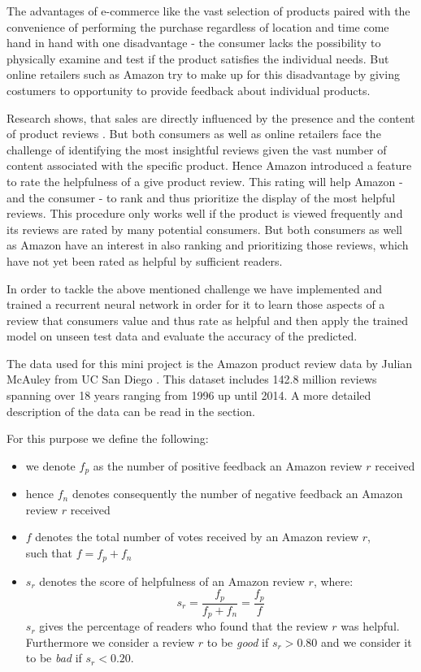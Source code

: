 \documentclass[a4paper,11pt]{article}
\begin{document}
The advantages of e-commerce like the vast selection of products paired with the convenience of performing the purchase regardless of location and time come hand in hand with one disadvantage - the consumer lacks the possibility to physically examine and test if the product satisfies the individual needs. But online retailers such as Amazon try to make up for this disadvantage by giving costumers to opportunity to provide feedback about individual products.

Research shows, that sales are directly influenced by the presence and the content of product reviews \cite{ChXi08}. But both consumers as well as online retailers face the challenge of identifying the most insightful reviews given the vast number of content associated with the specific product. Hence Amazon introduced a feature to rate the helpfulness of a give product review. This rating will help Amazon - and the consumer - to rank and thus prioritize the display of the most helpful reviews. This procedure only works well if the product is viewed frequently and its reviews are rated by many potential consumers. But both consumers as well as Amazon have an interest in also ranking and prioritizing those reviews, which have not yet been rated as helpful by sufficient readers.

In order to tackle the above mentioned challenge we have implemented and trained a recurrent neural network in order for it to learn those aspects of a review that consumers value and thus rate as helpful and then apply the trained model on unseen test data and evaluate the accuracy of the predicted.

The data used for this mini project is the Amazon product review data by Julian McAuley from UC San Diego \cite{HeMcA16a} \cite{McATarShiHen15}. This dataset includes 142.8 million reviews spanning over 18 years ranging from 1996 up until  2014. A more detailed description of the data can be read in the  section. 

For this purpose we define the following:

\begin{itemize}
\setlength\itemsep{0em}
\item we denote $f_p$ as the number of positive feedback an Amazon review $r$ received
\item hence $f_n$ denotes consequently the number of negative feedback an Amazon review $r$ received
\item $f$ denotes the total number of votes received by an Amazon review $r$, \\ such that $f = f_p + f_n$
\item $s_r$ denotes the score of helpfulness of an Amazon review $r$, where: $$ s_r = \frac{f_p}{f_p + f_n} = \frac{f_p}{f}$$
$s_r$ gives the percentage of readers who found that the review $r$ was helpful. Furthermore we consider a review $r$ to be \textit{good} if $s_r > 0.80$ and we consider it to be \textit{bad} if $s_r < 0.20$.
\end{itemize}
\end{document}
